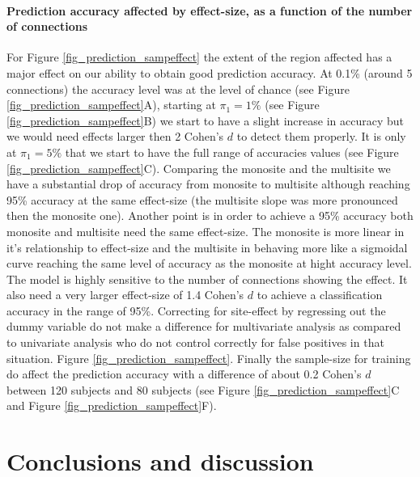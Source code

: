 \documentclass[authoryear]{elsarticle}
\begin{document}
\paragraph{Prediction accuracy affected by effect-size, as a function of the number of connections}
For Figure \ref{fig_prediction_sampeffect} the extent of the region affected has a major effect on our ability to obtain good prediction accuracy. At 0.1\% (around 5 connections) the accuracy level was at the level of chance (see Figure \ref{fig_prediction_sampeffect}A), starting at $\pi_1=1\%$ (see Figure \ref{fig_prediction_sampeffect}B) we start to have a slight increase in accuracy but we would need effects larger then 2 Cohen's $d$ to detect them properly. It is only at $\pi_1=5\%$ that we start to have the full range of accuracies values (see Figure \ref{fig_prediction_sampeffect}C). Comparing the monosite and the multisite we have a substantial drop of accuracy from monosite to multisite although reaching 95\% accuracy at the same effect-size (the multisite slope was more pronounced then the monosite one). Another point is in order to achieve a 95\% accuracy both monosite and multisite need the same effect-size. The monosite is more linear in it's relationship to effect-size and the multisite in behaving more like a sigmoidal curve reaching the same level of accuracy as the monosite at hight accuracy level. The model is highly sensitive to the number of connections showing the effect. It also need a very larger effect-size of 1.4 Cohen's $d$ to achieve a classification accuracy in the range of 95\%. Correcting for site-effect by regressing out the dummy variable do not make a difference for multivariate analysis as compared to univariate analysis who do not control correctly for false positives in that situation.
Figure \ref{fig_prediction_sampeffect}. Finally the sample-size for training do affect the prediction accuracy with a difference of about 0.2 Cohen's $d$ between 120 subjects and 80 subjects (see Figure \ref{fig_prediction_sampeffect}C and Figure \ref{fig_prediction_sampeffect}F).


\section{Conclusions and discussion}

\end{document}
